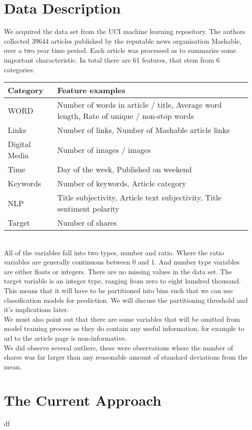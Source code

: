 \documentclass{article}
\begin{document}
\section{Data Description}
We acquired the data set from the UCI machine learning repository. The authors collected 39644 articles published by the reputable news organisation Mashable, over a two year time period. Each article was processed as to summarise some important characteristic. In total there are 61 features, that stem from 6 categories. \\

\begin{tabularx}{0.8\textwidth} {
    | >{\raggedright\arraybackslash}X
    | >{\raggedright\arraybackslash}X | }
  \hline
  Category & Feature examples \\
  \hline
  WORD & Number of words in article / title, Average word length, Rate of unique / non-stop words \\
  \hline
  Links & Number of links, Number of Mashable article links \\
  \hline
  Digital Media & Number of images / images \\
  \hline
  Time & Day of the week, Published on weekend \\
  \hline
  Keywords & Number of keywords, Article category \\
  \hline
  NLP & Title subjectivity, Article text subjectivity, Title sentiment polarity \\
  \hline
  Target & Number of shares \\
  \hline
\end{tabularx} \\

All of the variables fall into two types, number and ratio. Where the ratio variables are generally continuous between 0 and 1. And number type variables are either floats or integers. There are no missing values in the data set. The target variable is an integer type, ranging from zero to eight hundred thousand. This means that it will have to be partitioned into bins such that we can use classification models for prediction. We will discuss the partitioning threshold and it’s implications later. \\

We must also point out that there are some variables that will be omitted from model training process as they do contain any useful information, for example to url to the article page is non-informative. \\

We did observe several outliers, these were observations where the number of shares was far larger than any reasonable amount of standard deviations from the mean.

\section{The Current Approach}
df
\end{document}
